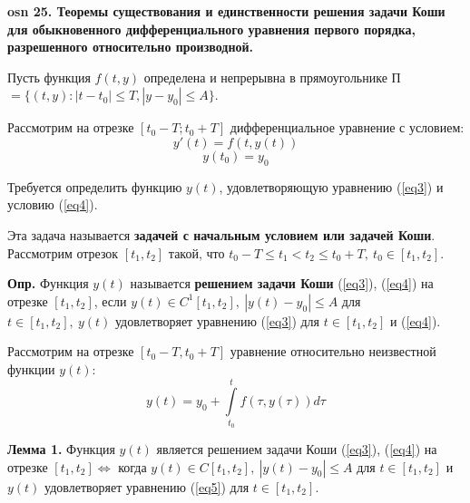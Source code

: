 \textbf{\LARGE osn 25. Теоремы существования и единственности решения задачи Коши для обыкновенного дифференциального уравнения первого порядка, разрешенного относительно производной.}

Пусть функция $f(t,y)$ определена и непрерывна в прямоугольнике 
П$ = \{(t, y) : |t - t_0| \leqslant T, |y - y_0| \leqslant A\}$.

Рассмотрим на отрезке $[t_0 - T ; t_0 + T ]$ дифференциальное уравнение с условием:
\begin{equation}
    y'(t) = f(t, y(t))
    \label{eq3}
\end{equation}
\begin{equation}
    y(t_0) = y_0
    \label{eq4}
\end{equation}

Требуется определить функцию $y(t)$, удовлетворяющую уравнению (\ref{eq3}) и условию (\ref{eq4}).

Эта задача называется \textbf{задачей с начальным условием или задачей Коши}. Рассмотрим отрезок $[t_1, t_2]$ такой, что $t_0 - T \leqslant t_1 < t_2 \leqslant t_0 + T,~t_0 \in [t_1, t_2]$.

\textbf{Опр.} Функция $y(t)$ называется \textbf{решением задачи Коши} (\ref{eq3}), (\ref{eq4}) на отрезке $[t_1, t_2]$, если $y(t) \in C^1[t_1, t_2],~|y(t) - y_0| \leqslant A$ для $t \in [t_1, t_2],~y(t)$ удовлетворяет уравнению (\ref{eq3}) для $t \in [t_1, t_2]$ и (\ref{eq4}).

Рассмотрим на отрезке $[t_0 - T,t_0 + T]$ уравнение относительно неизвестной функции $y(t)$:
\begin{equation}
    y(t) = y_0 + \int\limits_{t_0}^{t}f(\tau, y(\tau))d\tau
    \label{eq5}
\end{equation}

\textbf{Лемма 1.} Функция $y(t)$ является решением задачи Коши (\ref{eq3}), (\ref{eq4}) на отрезке $[t_1, t_2] \iff$ когда $y(t) \in C[t_1, t_2],~|y(t) - y_0| \leqslant A$ для $t \in [t_1, t_2]$ и $y(t)$ удовлетворяет уравнению (\ref{eq5}) для $t \in [t_1, t_2]$.

